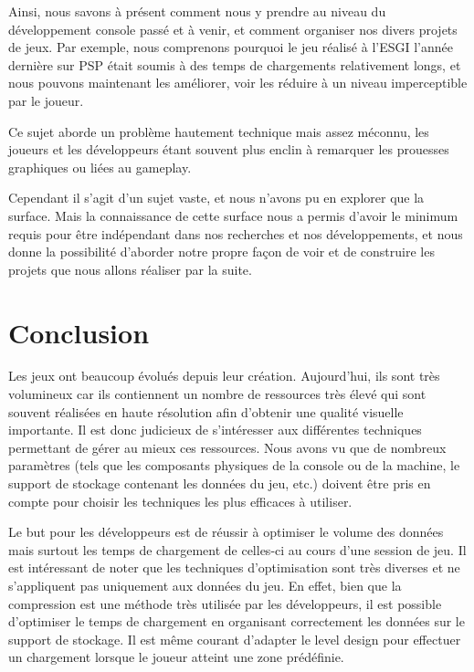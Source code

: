\documentclass[a4paper, 12pt]{article} %
\begin{document}
Ainsi, nous savons à présent comment nous y prendre au niveau du développement console passé et à venir, et comment organiser nos divers projets de jeux. Par exemple, nous comprenons pourquoi le jeu réalisé à l'ESGI l'année dernière sur PSP était soumis à des temps de chargements relativement longs, et nous pouvons maintenant les améliorer, voir les réduire à un niveau imperceptible par le joueur.

Ce sujet aborde un problème hautement technique mais assez méconnu, les joueurs et les développeurs étant souvent plus enclin à remarquer les prouesses graphiques ou liées au gameplay.

Cependant il s'agit d'un sujet vaste, et nous n'avons pu en explorer que la surface. Mais la connaissance de cette surface nous a permis d'avoir le minimum requis pour être indépendant dans nos recherches et nos développements, et nous donne la possibilité d'aborder notre propre façon de voir et de construire les projets que nous allons réaliser par la suite.


\newpage
\section{Conclusion}

Les jeux ont beaucoup évolués depuis leur création. Aujourd'hui, ils sont très volumineux car ils contiennent un nombre de ressources très élevé qui sont souvent réalisées en haute résolution afin d'obtenir une qualité visuelle importante. Il est donc judicieux de s'intéresser aux différentes techniques permettant de gérer au mieux ces ressources. Nous avons vu que de nombreux paramètres (tels que les composants physiques de la console ou de la machine, le support de stockage contenant les données du jeu, etc.) doivent être pris en compte pour choisir les techniques les plus efficaces à utiliser. 

Le but pour les développeurs est de réussir à optimiser le volume des données mais surtout les temps de chargement de celles-ci au cours d'une session de jeu. Il est intéressant de noter que les techniques d'optimisation sont très diverses et ne s'appliquent pas uniquement aux données du jeu. En effet, bien que la compression est une méthode très utilisée par les développeurs, il est possible d'optimiser le temps de chargement en organisant correctement les données sur le support de stockage. Il est même courant d'adapter le level design pour effectuer un chargement lorsque le joueur atteint une zone prédéfinie.
\end{document}
